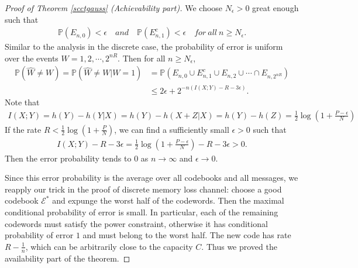 \documentclass{article}
\numberwithin{equation}{section}
\newcommand{\bbP}{\mathbb{P}}
\renewcommand{\cal}{\mathcal}
\newcommand{\wh}{\widehat}
\theoremstyle{plain}
\theoremstyle{definition}
\begin{document}
\begin{proof}[Proof of Theorem \ref{scctgauss} (Achievability part)]
We choose $N_\epsilon>0$ great enough such that
\begin{align*}
	\bbP(E_{n,0})<\epsilon\quad and\quad \bbP(E_{n,1}^c)<\epsilon\quad for\ all\ n\geq N_\epsilon.
\end{align*}
Similar to the analysis in the discrete case, the probability of error is uniform over the events $W=1,2,\cdots,2^{nR}$. Then for all $n\geq N_\epsilon$,
\begin{align*}
	\bbP(\wh{W}\neq W)=\bbP(\wh{W}\neq W|W=1)&=\bbP\left(E_{n,0}\cup E_{n,1}^c\cup E_{n,2}\cup\cdots\cap E_{n,2^{nR}}\right)\\
	&\leq 2\epsilon+2^{-n(I(X;Y)-R-3\epsilon)}.
\end{align*}
Note that
\begin{align*}
	I(X;Y)=h(Y)-h(Y|X)=h(Y)-h(X+Z|X)=h(Y)-h(Z)=\frac{1}{2}\log\left(1+\frac{P-\epsilon}{N}\right)
\end{align*}
If the rate $R<\frac{1}{2}\log(1+\frac{P}{N})$, we can find a sufficiently small $\epsilon>0$ such that
\begin{align*}
	I(X;Y)-R-3\epsilon=\frac{1}{2}\log\left(1+\frac{P-\epsilon}{N}\right)-R-3\epsilon>0.
\end{align*}
Then the error probability tends to $0$ as $n\to\infty$ and $\epsilon\to 0$. 

Since this error probability is the average over all codebooks and all messages, we reapply our trick in the proof of discrete memory loss channel: choose a good codebook $\cal{E}^*$ and expunge the worst half of the codewords. Then the maximal conditional probability of error is small. In particular, each of the remaining codewords must satisfy the power constraint, otherwise it has conditional probability of error $1$ and must belong to the worst half. The new code has rate $R-\frac{1}{n}$, which can be arbitrarily close to the capacity $C$. Thus we proved the availability part of the theorem.
\end{proof}
\end{document}
